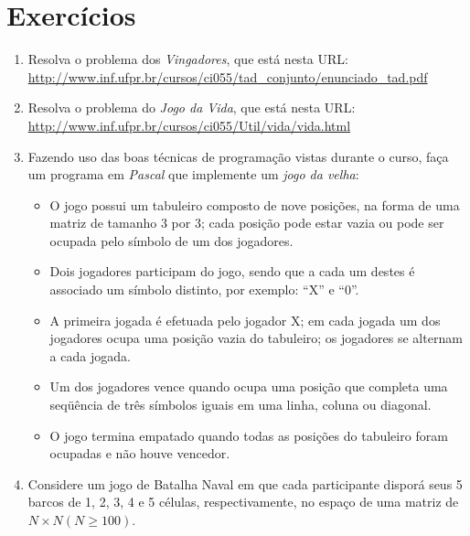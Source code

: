 \section{Exercícios}

\begin{enumerate}

\item Resolva o problema dos \emph{Vingadores}, que está nesta URL: \\
      \url{http://www.inf.ufpr.br/cursos/ci055/tad_conjunto/enunciado_tad.pdf}

\item Resolva o problema do \emph {Jogo da Vida}, que está nesta URL: \\
      \url{http://www.inf.ufpr.br/cursos/ci055/Util/vida/vida.html}

\item Fazendo uso das boas técnicas  de programação vistas durante o curso,
 faça um programa em  \emph{Pascal} que implemente  um \emph{jogo  da velha}:
 \begin{itemize}

  \item O jogo possui um tabuleiro composto de nove posições, na forma
  de uma matriz de  tamanho 3 por 3;  cada posição pode estar vazia ou
  pode ser ocupada pelo símbolo de um dos jogadores.

  \item Dois jogadores participam do jogo, sendo  que a cada um destes
  é associado um símbolo distinto, por exemplo: ``X'' e ``0''.

  \item A primeira jogada é efetuada pelo jogador X; em cada jogada um
  dos jogadores ocupa uma posição vazia  do tabuleiro; os jogadores se
  alternam a cada jogada.

  \item  Um dos jogadores vence  quando ocupa uma posição que completa
  uma seqüência   de  três símbolos   iguais em  uma  linha, coluna ou
  diagonal.

  \item O jogo termina empatado  quando todas as posições do tabuleiro
  foram ocupadas e não houve vencedor.
 \end{itemize}

\item Considere um jogo de Batalha Naval em que cada participante disporá seus 5 
barcos de 1, 2, 3, 4 e 5 células, respectivamente, no espaço de uma matriz 
de $N\times N (N \ge 100)$. 


\end{enumerate}
